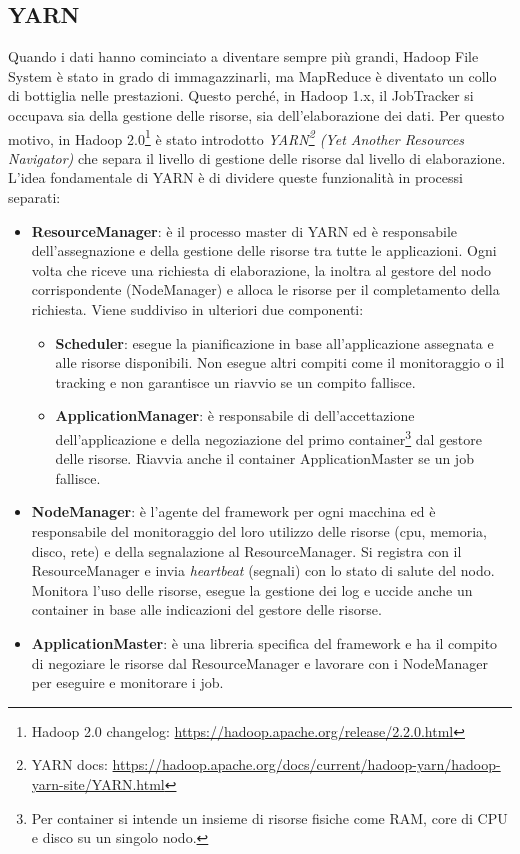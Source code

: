 \subsection{YARN} \label{yarn}
Quando i dati hanno cominciato a diventare sempre più grandi, Hadoop File System è stato in grado di immagazzinarli, ma MapReduce è diventato un collo di bottiglia nelle prestazioni. Questo perché, in Hadoop 1.x, il JobTracker si occupava sia della gestione delle risorse, sia dell'elaborazione dei dati. Per questo motivo, in Hadoop 2.0\footnote{Hadoop 2.0 changelog: \href{https://hadoop.apache.org/release/2.2.0.html}{https://hadoop.apache.org/release/2.2.0.html}} è stato introdotto \textit{YARN\footnote{YARN docs: \href{https://hadoop.apache.org/docs/current/hadoop-yarn/hadoop-yarn-site/YARN.html}{https://hadoop.apache.org/docs/current/hadoop-yarn/hadoop-yarn-site/YARN.html}} (Yet Another Resources Navigator)} che separa il livello di gestione delle risorse dal livello di elaborazione. L'idea fondamentale di YARN è di dividere queste funzionalità in processi separati:
\begin{itemize}
    \item \textbf{ResourceManager}: è il processo master di YARN ed è responsabile dell'assegnazione e della gestione delle risorse tra tutte le applicazioni. Ogni volta che riceve una richiesta di elaborazione, la inoltra al gestore del nodo corrispondente (NodeManager) e alloca le risorse per il completamento della richiesta. Viene suddiviso in ulteriori due componenti:
    \begin{itemize}
        \item \textbf{Scheduler}: esegue la pianificazione in base all'applicazione assegnata e alle risorse disponibili. Non esegue altri compiti come il monitoraggio o il tracking e non garantisce un riavvio se un compito fallisce. 
        \item \textbf{ApplicationManager}: è responsabile di dell'accettazione dell'applicazione e della negoziazione del primo container\footnote{Per container si intende un insieme di risorse fisiche come RAM, core di CPU e disco su un singolo nodo.} dal gestore delle risorse. Riavvia anche il container ApplicationMaster se un job fallisce.
    \end{itemize}
    \item \textbf{NodeManager}: è l'agente del framework per ogni macchina ed è responsabile del monitoraggio del loro utilizzo delle risorse (cpu, memoria, disco, rete) e della segnalazione al ResourceManager. Si registra con il ResourceManager e invia \textit{heartbeat} (segnali) con lo stato di salute del nodo. Monitora l'uso delle risorse, esegue la gestione dei log e uccide anche un container in base alle indicazioni del gestore delle risorse. 
    \item \textbf{ApplicationMaster}: è una libreria specifica del framework e ha il compito di negoziare le risorse dal ResourceManager e lavorare con i NodeManager per eseguire e monitorare i job.
\end{itemize}

